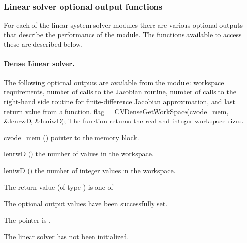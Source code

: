 
\subsubsection{Linear solver optional output functions}\label{sss:linsolv_io}

For each of the linear system solver modules there are various optional 
outputs that describe the performance of the module. The functions available 
to access these are described below.

\noindent\paragraph{\bf Dense Linear solver.}
The following optional outputs are available from the {\cvdense} module:
workspace requirements, number of calls to the Jacobian routine, number of 
calls to the right-hand side routine for finite-difference Jacobian approximation,
and last return value from a {\cvdense} function.
{
  flag = CVDenseGetWorkSpace(cvode\_mem, \&lenrwD, \&leniwD);
}
{
  The function  returns the
  {\cvdense} real and integer workspace sizes.
}
{
  \begin{args}
  \item[cvode\_mem] ()
    pointer to the {\cvodes} memory block.
  \item[lenrwD] ()
    the number of  values in the {\cvdense} workspace.
  \item[leniwD] ()
    the number of integer values in the {\cvdense} workspace.
  \end{args}
}
{
  The return value  (of type ) is one of
  \begin{args}
  \item[\Id{CVDENSE\_SUCCESS}] 
    The optional output values have been successfully set.
  \item[\Id{CVDENSE\_MEM\_NULL}]
    The  pointer is .
  \item[\Id{CVDENSE\_LMEM\_NULL}]
    The {\cvdense} linear solver has not been initialized.
  \end{args}
}
